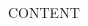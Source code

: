 \documentclass{article}
\date{\today}
\begin{document}
\maketitle

\begin{multicols}{3}

CONTENT

\closearticle

\end{multicols}
\end{document}
